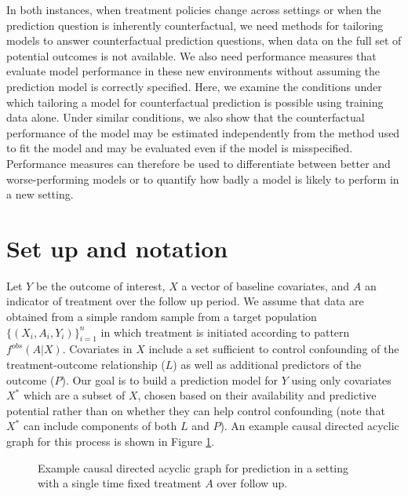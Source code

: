In both instances, when treatment policies change across settings or when the prediction question is inherently counterfactual, we need methods for tailoring models to answer counterfactual prediction questions, when data on the full set of potential outcomes is not available. We also need performance measures that evaluate model performance in these new environments without assuming the prediction model is correctly specified. Here, we examine the conditions under which tailoring a model for counterfactual prediction is possible using training data alone. Under similar conditions, we also show that the counterfactual performance of the model may be estimated independently from the method used to fit the model and may be evaluated even if the model is misspecified. Performance measures can therefore be used to differentiate between better and worse-performing models or to quantify how badly a model is likely to perform in a new setting. 


\section{Set up and notation} \label{sec:setup}
Let $Y$ be the outcome of interest, $X$ a vector of baseline covariates, and $A$ an indicator of treatment over the follow up period. We assume that data are obtained from a simple random sample from a target population $\{(X_i, A_i, Y_i)\}_{i=1}^n$ in which treatment is initiated according to pattern $f^{obs}(A | X)$. Covariates in $X$ include a set sufficient to control confounding of the treatment-outcome relationship ($L$) as well as additional predictors of the outcome ($P$). Our goal is to build a prediction model for $Y$ using only covariates $X^*$ which are a subset of $X$, chosen based on their availability and predictive potential rather than on whether they can help control confounding (note that $X^*$ can include components of both $L$ and $P$). An example causal directed acyclic graph for this process is shown in Figure \ref{fig:dag1}. 

\begin{figure}[t]
    \centering
    \caption{Example causal directed acyclic graph for prediction in a setting with a single time fixed treatment $A$ over follow up.}
    \label{fig:dag1}
\end{figure}

